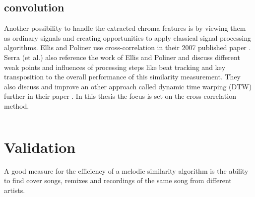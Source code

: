 \subsection{convolution}

Another possibility to handle the extracted chroma features is by viewing them as ordinary signals and creating opportunities to apply classical signal processing algorithms. Ellis and Poliner use cross-correlation in their 2007 published paper \cite{chroma3}. Serra (et al.) also reference the work of Ellis and Poliner and discuss different weak points and influences of processing steps like beat tracking and key transposition to the overall performance of this similarity measurement. 
They also discuss and improve an other approach called dynamic time warping (DTW) further in their paper \cite{chroma2}. In this thesis the focus is set on the cross-correlation method. 



\begin{equation} \label{eq:conv1}
\end{equation}

\section{Validation}

A good measure for the efficiency of a melodic similarity algorithm is the ability to find cover songs, remixes and recordings of the same song from different artists. 

